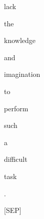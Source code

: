 \documentclass[varwidth=150mm]{standalone}
\begin{document}
\begin{CJK*}{UTF8}{gbsn}
{{{\colorbox{red!0.0}{\strut lack} \colorbox{red!0.0}{\strut the} \colorbox{red!0.0}{\strut knowledge} \colorbox{red!0.0}{\strut and} \colorbox{red!0.0}{\strut imagination} \colorbox{red!0.0}{\strut to} \colorbox{red!0.0}{\strut perform} \colorbox{red!1.16713547706604}{\strut such} \colorbox{red!2.194676637649536}{\strut a} \colorbox{red!1.2415045499801636}{\strut difficult} \colorbox{red!1.8670092821121216}{\strut task} \colorbox{red!3.9423773288726807}{\strut .} \colorbox{red!3.9186089038848877}{\strut [SEP]}
}}}
\end{CJK*}
\end{document}
